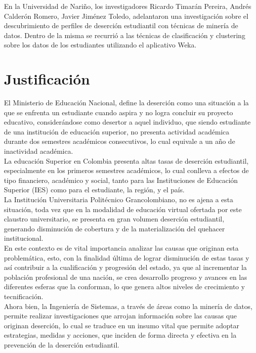 \documentclass[fleqn,10pt]{SelfArx} %
\begin{document}
En la Universidad de Nariño, los investigadores Ricardo Timarán Pereira, Andrés Calderón Romero, Javier Jiménez Toledo, adelantaron una investigación sobre el descubrimiento de perfiles de deserción estudiantil con técnicas de minería de datos. Dentro de la misma se recurrió a las técnicas de clasificación y clustering sobre los datos de los estudiantes utilizando el aplicativo Weka.\\



\section{Justificación}

El Ministerio de Educación Nacional, define la deserción como una situación a la que se enfrenta un estudiante cuando aspira y no logra concluir su proyecto educativo, considerándose como desertor a aquel individuo, que siendo estudiante de una institución de educación superior, no presenta actividad académica durante dos semestres académicos consecutivos, lo cual equivale a un año de inactividad académica. \\

La educación Superior en Colombia presenta altas tasas de deserción estudiantil, especialmente en los primeros semestres académicos, lo cual conlleva a efectos de tipo financiero, académico y social, tanto para las Instituciones de Educación Superior (IES) como para el estudiante, la región, y el país. \\

La Institución Universitaria Politécnico Grancolombiano, no es ajena a esta situación, toda vez que en la modalidad de educación virtual ofertada por este claustro universitario, se presenta en gran volumen deserción estudiantil, generando disminución de cobertura y de la materialización del quehacer institucional.\\

En este contexto es de vital importancia analizar las causas que originan esta problemática, esto, con la finalidad última de lograr disminución de estas tasas y así contribuir a la cualificación y progresión del estado, ya que al incrementar la población profesional de una nación, se crea desarrollo progreso y avances en las diferentes esferas que la conforman, lo que genera altos niveles de crecimiento y tecnificación.\\

Ahora bien, la Ingeniería de Sistemas, a través de áreas como la minería de datos, permite realizar investigaciones que arrojan información sobre las causas que originan deserción, lo cual se traduce en un insumo vital que permite adoptar estrategias, medidas y acciones, que inciden de forma directa y efectiva en la prevención de la deserción estudiantil.\\
\end{document}

